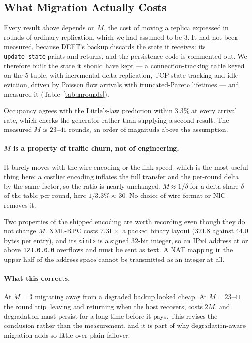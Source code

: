 \subsection{What Migration Actually Costs}
\label{sec:online:M}

Every result above depends on $M$, the cost of moving a replica expressed in
rounds of ordinary replication, which we had assumed to be $3$. It had not been
measured, because DEFT's backup discards the state it receives: its
\texttt{update\_state} prints and returns, and the persistence code is commented
out. We therefore built the state it should have kept --- a connection-tracking
table keyed on the 5-tuple, with incremental delta replication, TCP state
tracking and idle eviction, driven by Poisson flow arrivals with truncated-Pareto
lifetimes --- and measured it (Table~\ref{tab:mrounds}).

Occupancy agrees with the Little's-law prediction within $3.3\%$ at every arrival
rate, which checks the generator rather than supplying a second result. The
measured $M$ is $23$--$41$ rounds, an order of magnitude above the assumption.

\paragraph{$M$ is a property of traffic churn, not of engineering.} It barely
moves with the wire encoding or the link speed, which is the most useful thing
here: a costlier encoding inflates the full transfer and the per-round delta by
the same factor, so the ratio is nearly unchanged. $M \approx 1/\delta$ for a
delta share $\delta$ of the table per round, here $1/3.3\% \approx 30$. No choice
of wire format or NIC removes it.

Two properties of the shipped encoding are worth recording even though they do
not change $M$. XML-RPC costs $7.31\times$ a packed binary layout ($321.8$ against
$44.0$ bytes per entry), and its \texttt{<int>} is a signed 32-bit integer, so an
IPv4 address at or above \texttt{128.0.0.0} overflows and must be sent as text.
A NAT mapping in the upper half of the address space cannot be transmitted as an
integer at all.

\paragraph{What this corrects.} At $M = 3$ migrating away from a degraded backup
looked cheap. At $M = 23$--$41$ the round trip, leaving and returning when the
host recovers, costs $2M$, and degradation must persist for a long time before it
pays. This revises the conclusion rather than the measurement, and it is part of
why degradation-aware migration adds so little over plain failover.

